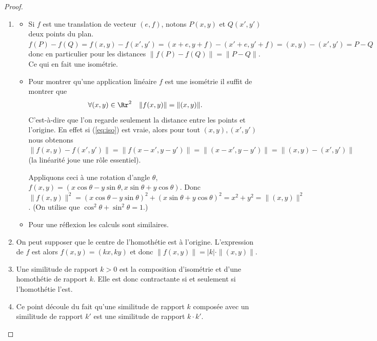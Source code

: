 \documentclass[11pt,class=report,crop=false]{standalone}
\begin{document}
\begin{proof}~
\begin{enumerate}
 \item \begin{itemize}
        \item Si $f$ est une translation de vecteur $(e,f)$, notons $P(x,y)$ et $Q(x',y')$ deux points du plan.
$f(P)-f(Q)=f(x,y)-f(x',y') = (x+e,y+f)-(x'+e,y'+f)=(x,y)-(x',y')=P-Q$
donc en particulier  pour les distances $\|f(P)-f(Q)\| = \|P-Q\|$. Ce qui en fait une isométrie.
  
        \item Pour montrer qu'une application linéaire $f$ est une isométrie il suffit de montrer que 
\begin{equation}
\label{eq:iso}
\forall (x,y) \in \Rr^2 \quad \| f(x,y) \| = \| (x,y) \|.
\end{equation}
C'est-à-dire que l'on regarde seulement la distance entre les points et l'origine.
En effet si (\ref{eq:iso}) est vraie, alors pour tout $(x,y), (x',y')$ nous obtenons
$\|f(x,y)-f(x',y')\| = \|f(x-x',y-y')\|=\|(x-x',y-y')\|=\|(x,y)-(x',y')\|$
(la linéarité joue une rôle essentiel).

Appliquons ceci à une rotation d'angle $\theta$,
$f(x,y)= (x \cos \theta - y \sin \theta,x\sin \theta + y \cos \theta)$.
Donc $\|f(x,y) \|^2 = (x \cos \theta - y \sin \theta)^2 + (x\sin \theta + y \cos \theta)^2=
x^2+y^2= \| (x,y) \|^2$. (On utilise que $\cos^2\theta + \sin^2\theta=1$.)

        \item Pour une réflexion les calculs sont similaires. 
       \end{itemize}


 \item On peut supposer que le centre de l'homothétie est à l'origine. 
L'expression de $f$ est alors $f(x,y)=(kx,ky)$ et donc 
$\|f(x,y) \| = |k| \cdot  \|(x,y)\|.$

 \item Une similitude de rapport $k > 0$ est la composition d'isométrie et d'une 
homothétie de rapport $k$. Elle est donc contractante si et seulement si l'homothétie l'est.

 \item Ce point découle du fait qu'une similitude de rapport $k$ composée avec un similitude de rapport $k'$ est une similitude de rapport $k\cdot k'$. 
\end{enumerate}
\end{proof}
\end{document}
